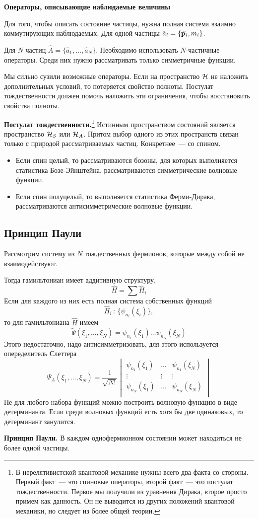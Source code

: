 \textbf{Операторы, описывающие наблюдаемые величины}

Для того, чтобы описать состояние частицы, нужна полная система взаимно коммутирующих наблюдаемых.
Для одной частицы $\hat a_i = \{\hat{\bf p_i}, m_i\}$.

Для $N$ частиц $\hat A = \{\hat a_1, \ldots, \hat a_N\}$. Необходимо использовать $N$-частичные операторы. Среди них нужно рассматривать только симметричные функции.

Мы сильно сузили возможные операторы. Если на пространство $\H$ не наложить дополнительных условий, то потеряется свойство полноты. Постулат тождественности должен помочь наложить эти ограничения, чтобы восстановить свойства полноты.

\textbf{Постулат тождественности.}\footnote{В нерелятивистской квантовой механике нужны всего два факта со стороны. Первый факт~--- это спиновые операторы, второй факт~--- это постулат тождественности. Первое мы получили из уравнения Дирака, второе просто примем как данность. Он не выводится из других положений квантовой механики, но следует из более общей теории.} Истинным пространством состояний является пространство $\H_S$ или $\H_A$. Притом выбор одного из этих пространств связан только с природой рассматриваемых частиц. Конкретнее~--- со спином.

\begin{itemize}
  \item Если спин целый, то рассматриваются бозоны, для которых выполняется статистика Бозе-Эйнштейна, рассматриваются симметрические волновые функции.
  \item Если спин полуцелый, то выполняется статистика Ферми-Дирака, рассматриваются антисимметрические волновые функции.
\end{itemize}
\subsection{Принцип Паули} Рассмотрим систему из $N$ тождественных фермионов, которые между собой не взаимодействуют.

Тогда гамильтониан имеет аддитивную структуру,
$$
    \hat H = \sum \hat H_i
$$ 
Если для каждого из них есть полная система собственных функций
$$
    \hat H_i \, : \, \{\psi_{n_i} (\xi_i)\},
$$
то для гамильтониана $\hat H$ имеем
$$
    \tilde\Psi(\xi_1, \ldots, \xi_N) = \psi_{n_1} (\xi_1) \ldots \psi_{n_N} (\xi_N) 
$$
Этого недостаточно, надо антисимметризовать, для этого используется опеределитель Слеттера
$$
    \Psi_A (\xi_1, \ldots, \xi_N) = \dfrac{1}{\sqrt{N!}}
\begin{vmatrix}
  \psi_{n_1} (\xi_1) & \ldots & \psi_{n_1} (\xi_N) \\
  \vdots & \vdots & \vdots \\
  \psi_{n_N}(\xi_1) & \ldots & \psi_{n_N} (\xi_N) \\
\end{vmatrix}
$$
Не для любого набора функций можно построить волновую функцию в виде детерминанта. Если среди волновых функций есть хотя бы две одинаковых, то детерминант занулится.

\textbf{Принцип Паули.} В каждом однофермионном состоянии может находиться не более одной частицы. 